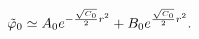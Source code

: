 \begin{equation}
{\tilde \varphi}_0 \simeq A_0 e^{-{{\sqrt{C_0}}\over 2 }r^2} +
  B_0 e^{{{\sqrt{C_0}}\over 2 }r^2}.
\label{sol_approx_r0}
\end{equation}

